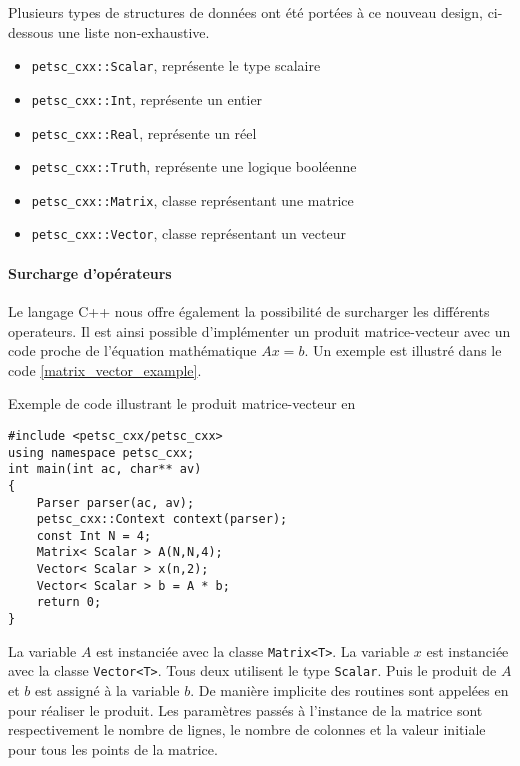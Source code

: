 Plusieurs types de structures de données ont été portées à ce nouveau design, ci-dessous une liste non-exhaustive.

\begin{itemize}
\item \verb#petsc_cxx::Scalar#, représente le type scalaire
\item \verb#petsc_cxx::Int#, représente un entier
\item \verb#petsc_cxx::Real#, représente un réel
\item \verb#petsc_cxx::Truth#, représente une logique booléenne
\item \verb#petsc_cxx::Matrix#, classe représentant une matrice
\item \verb#petsc_cxx::Vector#, classe représentant un vecteur
\end{itemize}

\paragraph{Surcharge d'opérateurs}

Le langage C++ nous offre également la possibilité de surcharger les différents operateurs. Il est ainsi possible d'implémenter un produit matrice-vecteur avec un code proche de l'équation mathématique $Ax = b$. Un exemple est illustré dans le code \ref{matrix_vector_example}.

\begin{algorithm}[h]
  \caption{Exemple de code illustrant le produit matrice-vecteur en \petscx}
  \label{matrix_vector_example}
\begin{verbatim}
#include <petsc_cxx/petsc_cxx>
using namespace petsc_cxx;
int main(int ac, char** av)
{
    Parser parser(ac, av);
    petsc_cxx::Context context(parser);
    const Int N = 4;
    Matrix< Scalar > A(N,N,4);
    Vector< Scalar > x(n,2);
    Vector< Scalar > b = A * b;
    return 0;
}
\end{verbatim}
\end{algorithm}

La variable $A$ est instanciée avec la classe \verb#Matrix<T>#. La variable $x$ est instanciée avec la classe \verb#Vector<T>#. Tous deux utilisent le type \verb#Scalar#. Puis le produit de $A$ et $b$ est assigné à la variable $b$. De manière implicite des routines sont appelées en \petsc pour réaliser le produit. Les paramètres passés à l'instance de la matrice sont respectivement le nombre de lignes, le nombre de colonnes et la valeur initiale pour tous les points de la matrice.
